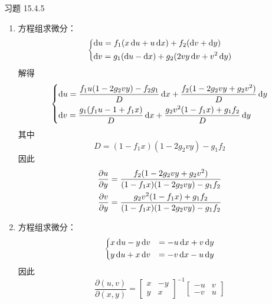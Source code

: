 \begin{problem}
    习题 15.4.5
    \begin{solution}
        \begin{enumerate}
            \item[\textbf{1)}] 方程组求微分：
            $$
            \begin{dcases}
                \dd{u} = f_1 (x \dd{u} + u \dd{x}) + f_2 (\dd{v} + \dd{y}) \\
                \dd{v} = g_1 (\dd{u} - \dd{x}) + g_2 (2v y \dd{v} + v^2 \dd{y}) \\
            \end{dcases}
            $$
            解得
            $$
            \begin{dcases}
                \dd{u} = \frac{f_1 u(1 - 2g_2 vy) - f_2 g_1}{D} \dd{x} + \frac{f_2(1 - 2g_2 vy + g_2 v^2)}{D} \dd{y} \\
                \dd{v} = \frac{g_1(f_1 u - 1 + f_1 x)}{D} \dd{x} + \frac{g_2 v^2(1 - f_1 x) + g_1 f_2}{D} \dd{y}
            \end{dcases}
            $$
            其中
            $$
            D = (1 - f_1 x)(1 - 2g_2 vy) - g_1 f_2
            $$
            因此
            $$
            \begin{aligned}
                \pdv{u}{y} & = \frac{f_2 (1 - 2g_2 vy + g_2 v^2)}{(1 - f_1 x)(1 - 2g_2 vy) - g_1 f_2} \\
                \pdv{v}{y} & = \frac{g_2 v^2(1 - f_1 x) + g_1 f_2}{(1 - f_1 x)(1 - 2g_2 vy) - g_1 f_2}
            \end{aligned}
            $$

            \item[\textbf{2)}] 方程组求微分：
            $$
            \begin{dcases}
                x \dd{u} - y \dd{v} & = -u \dd{x} + v \dd{y} \\
                y \dd{u} + x \dd{v} & = -v \dd{x} - u \dd{y} \\
            \end{dcases}
            $$
            因此
            $$
            \frac{\partial(u, v)}{\partial(x, y)} = \begin{bmatrix}
                x & -y \\
                y & x 
            \end{bmatrix}^{-1} \begin{bmatrix}
                -u & v \\
                -v & u 
            \end{bmatrix}
            $$
        \end{enumerate}
    \end{solution}
\end{problem}

